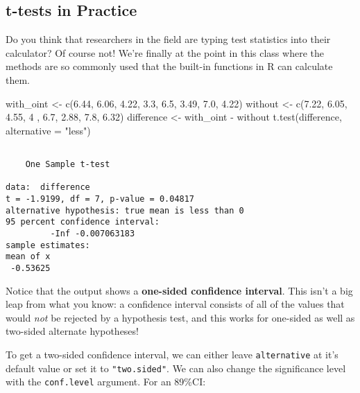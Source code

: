 \documentclass[
  letterpaper,
  DIV=11,
  numbers=noendperiod]{scrreprt}
\newenvironment{Shaded}{\begin{snugshade}}{\end{snugshade}}
\newcommand{\AttributeTok}[1]{\textcolor[rgb]{0.40,0.45,0.13}{#1}}
\newcommand{\DecValTok}[1]{\textcolor[rgb]{0.68,0.00,0.00}{#1}}
\newcommand{\FloatTok}[1]{\textcolor[rgb]{0.68,0.00,0.00}{#1}}
\newcommand{\FunctionTok}[1]{\textcolor[rgb]{0.28,0.35,0.67}{#1}}
\newcommand{\NormalTok}[1]{\textcolor[rgb]{0.00,0.23,0.31}{#1}}
\newcommand{\OtherTok}[1]{\textcolor[rgb]{0.00,0.23,0.31}{#1}}
\newcommand{\SpecialCharTok}[1]{\textcolor[rgb]{0.37,0.37,0.37}{#1}}
\newcommand{\StringTok}[1]{\textcolor[rgb]{0.13,0.47,0.30}{#1}}
\begin{document}
\hypertarget{t-tests-in-practice}{%
\subsection{t-tests in Practice}\label{t-tests-in-practice}}

Do you think that researchers in the field are typing test statistics
into their calculator? Of course not! We're finally at the point in this
class where the methods are so commonly used that the built-in functions
in R can calculate them.

\begin{Shaded}
\begin{Highlighting}[]
\NormalTok{with\_oint }\OtherTok{\textless{}{-}} \FunctionTok{c}\NormalTok{(}\FloatTok{6.44}\NormalTok{, }\FloatTok{6.06}\NormalTok{, }\FloatTok{4.22}\NormalTok{, }\FloatTok{3.3}\NormalTok{, }\FloatTok{6.5}\NormalTok{, }\FloatTok{3.49}\NormalTok{, }\FloatTok{7.0}\NormalTok{, }\FloatTok{4.22}\NormalTok{)}
\NormalTok{without }\OtherTok{\textless{}{-}} \FunctionTok{c}\NormalTok{(}\FloatTok{7.22}\NormalTok{, }\FloatTok{6.05}\NormalTok{, }\FloatTok{4.55}\NormalTok{, }\DecValTok{4}\NormalTok{  , }\FloatTok{6.7}\NormalTok{, }\FloatTok{2.88}\NormalTok{, }\FloatTok{7.8}\NormalTok{, }\FloatTok{6.32}\NormalTok{)}
\NormalTok{difference }\OtherTok{\textless{}{-}}\NormalTok{ with\_oint }\SpecialCharTok{{-}}\NormalTok{ without}
\FunctionTok{t.test}\NormalTok{(difference, }\AttributeTok{alternative =} \StringTok{"less"}\NormalTok{)}
\end{Highlighting}
\end{Shaded}

\begin{verbatim}

    One Sample t-test

data:  difference
t = -1.9199, df = 7, p-value = 0.04817
alternative hypothesis: true mean is less than 0
95 percent confidence interval:
         -Inf -0.007063183
sample estimates:
mean of x 
 -0.53625 
\end{verbatim}

Notice that the output shows a \textbf{one-sided confidence interval}.
This isn't a big leap from what you know: a confidence interval consists
of all of the values that would \emph{not} be rejected by a hypothesis
test, and this works for one-sided as well as two-sided alternate
hypotheses!

To get a two-sided confidence interval, we can either leave
\texttt{alternative} at it's default value or set it to
\texttt{"two.sided"}. We can also change the significance level with the
\texttt{conf.level} argument. For an 89\%CI:
\end{document}
